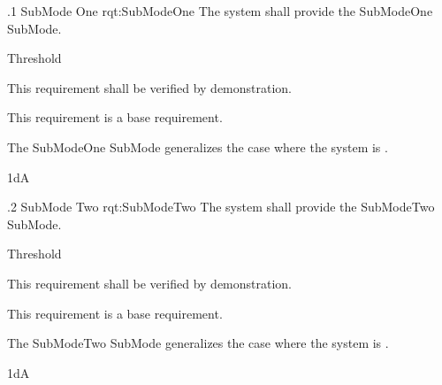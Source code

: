 \ONERQMTV
{\RqtNumberBase.1}
{SubMode One}
{rqt:SubModeOne}
{The system shall provide the SubModeOne SubMode.}
{
	\item [Phase 1] Threshold
}
{This requirement shall be verified by demonstration.}
{
	\item [N/A] This requirement is a base requirement.
}
{
	\item The SubModeOne SubMode generalizes the case where the system is \TBD.
}
{1dA}


\ONERQMTV
{\RqtNumberBase.2}
{SubMode Two}
{rqt:SubModeTwo}
{The system shall provide the SubModeTwo SubMode.}
{
	\item [Phase 1] Threshold
}
{This requirement shall be verified by demonstration.}
{
	\item [N/A] This requirement is a base requirement.
}
{
	\item The SubModeTwo SubMode generalizes the case where the system is \TBD.
}
{1dA}


